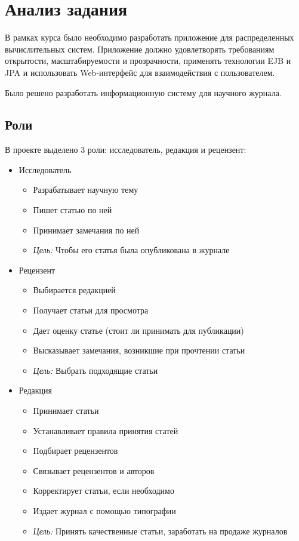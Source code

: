 \section{Анализ задания}
В рамках курса было необходимо разработать приложение для распределенных вычислительных систем. Приложение должно удовлетворять требованиям открытости, масштабируемости и прозрачности, применять технологии EJB и JPA и использовать Web-интерфейс для взаимодействия с пользователем.

Было решено разработать информационную систему для научного журнала.

\subsection{Роли}

В проекте выделено 3 роли: исследователь, редакция и рецензент:

\begin{itemize}
\item Исследователь

\begin{itemize}
\item Разрабатывает научную тему
\item Пишет статью по ней
\item Принимает замечания по ней
\item \textit{Цель:} Чтобы его статья была опубликована в журнале
\end{itemize}
\item Рецензент

\begin{itemize}
\item Выбирается редакцией
\item Получает статьи для просмотра
\item Дает оценку статье (стоит ли принимать для публикации)
\item Высказывает замечания, возникшие при прочтении статьи
\item \textit{Цель:} Выбрать подходящие статьи
\end{itemize}
\item Редакция

\begin{itemize}
\item Принимает статьи
\item Устанавливает правила принятия статей
\item Подбирает рецензентов
\item Связывает рецензентов и авторов
\item Корректирует статьи, если необходимо
\item Издает журнал с помощью типографии
\item \textit{Цель:} Принять качественные статьи, заработать на продаже журналов
\end{itemize}
\end{itemize}

